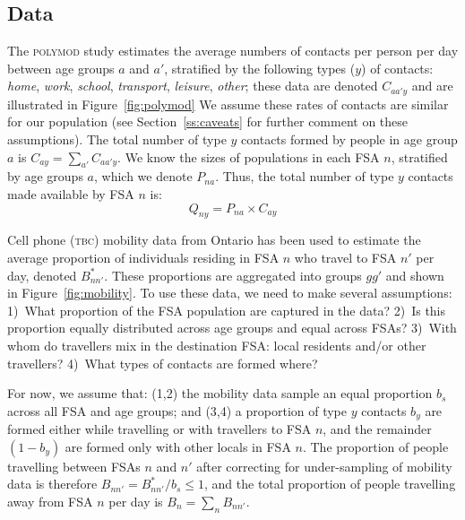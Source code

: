 \documentclass{article}
\begin{document}
  \subsection{Data}\label{ss:data}
  The \textsc{polymod} study estimates the average numbers of contacts per person per day
  between age groups $a$ and $a'$, stratified by the following types ($y$) of contacts:
  \emph{home}, \emph{work}, \emph{school}, \emph{transport}, \emph{leisure}, \emph{other};
  these data are denoted $C_{aa'y}$ and are illustrated in Figure~\ref{fig:polymod}
  We assume these rates of contacts are similar for our population
  (see Section~\ref{ss:caveats} for further comment on these assumptions).
  The total number of type $y$ contacts formed by people in age group $a$ is
  $C_{ay} = \sum_{a'} C_{aa'y}$.
  We know the sizes of populations in each FSA $n$, stratified by age groups $a$,
  which we denote $P_{na}$.
  Thus, the total number of type $y$ contacts made available by FSA $n$ is:
  \begin{equation}
    Q_{ny} = P_{na} \times C_{ay}
    \label{eq:Q.ny}
  \end{equation}
  \par
  Cell phone (\textsc{tbc}) mobility data from Ontario has been used to estimate
  the average proportion of individuals residing in FSA $n$ who travel to FSA $n'$ per day,
  denoted $B^*_{nn'}$.
  These proportions are aggregated into groups $gg'$ and shown in Figure~\ref{fig:mobility}.
  To use these data, we need to make several assumptions:
  1)~What proportion of the FSA population are captured in the data?
  2)~Is this proportion equally distributed across age groups and equal across FSAs?
  3)~With whom do travellers mix in the destination FSA: local residents and/or other travellers?
  4)~What types of contacts are formed where?
  \par
  For now, we assume that:
  (1,2) the mobility data sample an equal proportion $b_s$ across all FSA and age groups; and
  (3,4) a proportion of type $y$ contacts $b_y$ are formed
  either while travelling or with travellers to FSA $n$,
  and the remainder $(1-b_y)$ are formed only with other locals in FSA $n$.
  The proportion of people travelling between FSAs $n$ and $n'$
  after correcting for under-sampling of mobility data is therefore $B_{nn'} = B^*_{nn'}/b_s \le 1$,
  and the total proportion of people travelling away from FSA $n$ per day is $B_n = \sum_n B_{nn'}$.
\end{document}
